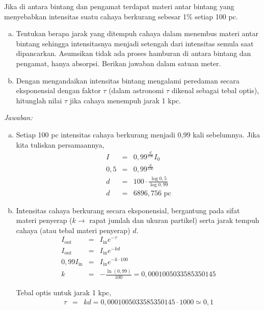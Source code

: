 \documentclass[11pt,fleqn]{exam}
\begin{document}
\begin{questions}
\vspace{0.5cm}
\question Jika di antara bintang dan pengamat terdapat materi antar bintang yang menyebabkan intensitas suatu cahaya berkurang sebesar 1\% setiap 100 pc.
\begin{enumerate}[a.]
\item Tentukan berapa jarak yang ditempuh cahaya dalam menembus materi antar bintang sehingga intensitasnya menjadi setengah dari intensitas semula saat dipancarkan. Asumsikan tidak ada proses hamburan di antara bintang dan pengamat, hanya absorpsi. Berikan jawaban dalam satuan meter.
\item Dengan mengandaikan intensitas bintang mengalami peredaman secara eksponensial dengan faktor $\tau$ (dalam astronomi $\tau$ dikenal sebagai tebal optis), hitunglah nilai $\tau$ jika cahaya menempuh jarak 1 kpc.
\end{enumerate}


\textit{Jawaban: }

\begin{enumerate}[a.]
	\item Setiap 100 pc intensitas cahaya berkurang menjadi 0,99 kali sebelumnya. Jika kita tuliskan persamaannya,
	\begin{eqnarray*}
		I &=& 0,99^{\frac{d}{100}} I_0 \\
		0,5 &=& 0,99^{\frac{d}{100}}\\
		d &=& 100 \cdot \frac{\log{0,5}}{\log{0,99}}\\
		d &=& 6896,756 \text{  pc}
	\end{eqnarray*}

	
	\item Intensitas cahaya berkurang secara eksponensial, bergantung pada sifat materi penyerap ($k \rightarrow$ rapat jumlah dan ukuran partikel) serta jarak tempuh cahaya (atau tebal materi penyerap) $d$.
	\begin{eqnarray*}
		I_\text{out} &=& I_\text{in} e^{-\tau}\\
		I_\text{out} &=& I_\text{in} e^{- k d}\\
		0,99 I_\text{in} &=& I_\text{in} e^{- k \cdot 100}\\
		k &=& - \frac{\ln{(0,99)}}{100} = 0,0001005033585350145
	\end{eqnarray*}
	
	Tebal optis untuk jarak 1 kpc,
	\begin{eqnarray*}
		\tau &=& kd = 0,0001005033585350145 \cdot 1000 \simeq 0,1
	\end{eqnarray*}
\end{enumerate}



\end{questions}
\end{document}
